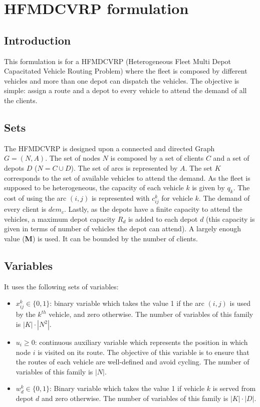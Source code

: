 \documentclass[preprint,review,12pt]{elsarticle}
\begin{document}
\section{HFMDCVRP formulation}

\subsection{Introduction}
This formulation is for a HFMDCVRP (Heterogeneous Fleet Multi Depot Capacitated Vehicle Routing Problem) where the fleet is composed by different vehicles and more than one depot can dispatch the vehicles. The objective is simple: assign a route and a depot to every vehicle  to attend the demand of all the clients. 

\subsection{Sets}
The HFMDCVRP is designed upon a connected and directed Graph $G = (N,A)$. The set of nodes $N$ is composed by a set of clients $C$ and a set of depots $D$ ($N = C \cup D$). The set of arcs is represented by $A$. The set $K$ corresponds to the set of available vehicles to attend the demand. As the fleet is supposed to be heterogeneous, the capacity of each vehicle $k$ is given by $q_k$. The cost of using the arc $(i,j)$ is represented with $c_{ij}^k$ for vehicle $k$. The demand of every client is $dem_c$. Lastly, as the depots have a finite capacity to attend the vehicles, a maximum depot capacity $R_d$ is added to each depot $d$ (this capacity is given in terms of number of vehicles the depot can attend). A largely enough value (\textbf{M}) is used. It can be bounded by the number of clients.

\subsection{Variables}
It uses the following sets of variables:

\begin{itemize}
	\item $x_{ij}^k \in \{0,1\}$: binary variable which takes the value 1 if the arc $(i,j)$ is used by the $k^{th}$ vehicle, and zero otherwise. The number of variables of this family is $|K| \cdot |N^2|$.
	\item $u_i \geq 0$: continuous auxiliary variable which represents the position in which node $i$ is visited on its route. The objective of this variable is to ensure that the routes of each vehicle are well-defined and avoid cycling. The number of variables of this family is $|N|$.
	\item  $w_d^k \in  \{0,1\}$: Binary variable which takes the value 1 if vehicle $k$ is served from depot $d$ and zero otherwise. The number of variables of this family is $|K| \cdot |D|$.
\end{itemize}
\end{document}
